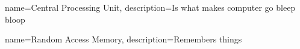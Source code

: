 \makeglossaries

{
	name={Central Processing Unit},
	description={Is what makes computer go bleep bloop}
}


{
	name={Random Access Memory},
	description={Remembers things}
}
